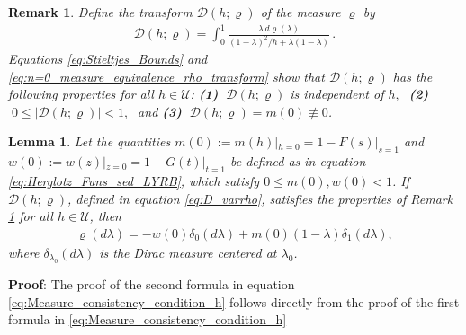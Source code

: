 \documentclass[english,12pt,jmp,graphicx]{revtex4-1}
\newtheorem{lemma}{Lemma}[section]
\newtheorem{remark}{Remark}[section]
\begin{document}
%
%
\begin{remark}\label{rem:varrho_conditions}
  Define the transform $\mathcal{D}(h;\varrho)$ of the measure $\varrho$ by
  \begin{align}\label{eq:D_varrho}
    \mathcal{D}(h;\varrho)=\int_0^1\frac{\lambda\,d\varrho(\lambda)}{(1-\lambda)^2/h+\lambda(1-\lambda)}\,.
  \end{align}
  Equations \eqref{eq:Stieltjes_Bounds} and 
  \eqref{eq:n=0_measure_equivalence_rho_transform}
  show that $\mathcal{D}(h;\varrho)$ has the following properties for
  all $h\in\mathcal{U}$:
  \newline
  \textbf{(1)} $\;\mathcal{D}(h;\varrho)$ is independent of $h,\;$ \textbf{(2)}
  $\;0\leq|\mathcal{D}(h;\varrho)|<1,\;$ and \textbf{(3)} $\;\mathcal{D}(h;\varrho)=m(0)\not\equiv0$. 
%  
\end{remark}
%
%
\begin{lemma}\label{lem:Measure_consistency_condition}
  Let the quantities $m(0):=m(h)|_{h=0}=1-F(s)|_{s=1}$ and
  $w(0):=w(z)|_{z=0}=1-G(t)|_{t=1}$ be defined as in equation
  \eqref{eq:Herglotz_Funs_sed_LYRB}, which satisfy $0\leq m(0),w(0)<1$. If
  $\mathcal{D}(h;\varrho)$, defined in equation \eqref{eq:D_varrho},
  satisfies the properties of Remark \ref{rem:varrho_conditions} for
  all $h\in\mathcal{U}$, then     
\begin{align}\label{eq:Measure_consistency_condition_h}
 \varrho(d\lambda)=-w(0)\delta_0(d\lambda)+m(0)(1-\lambda)\delta_1(d\lambda),
\end{align}
%
where $\delta_{\lambda_0}(d\lambda)$ is the Dirac measure centered at $\lambda_0$. 
%
\end{lemma}
%
\noindent \textbf{Proof}:
%
The proof of the second formula in equation
\eqref{eq:Measure_consistency_condition_h} follows directly from the
proof of the first formula in \eqref{eq:Measure_consistency_condition_h}
\end{document}

